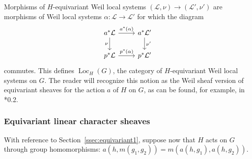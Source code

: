 \documentclass[10pt]{amsart}
\theoremstyle{plain}
\theoremstyle{definition}
\DeclareMathOperator{\Loc}{Loc}
\newcommand{\cs}[1]{{\mathcal{#1}}}
\begin{document}
Morphisms of $H$-equivariant Weil local systems $(\cs{L},\nu)\to (\cs{L}',\nu')$ are morphisms of Weil local systems $\alpha: \cs{L}\to \cs{L}'$ for which the diagram
\begin{equation}\label{E3}
\begin{tikzcd}
\arrow{d}[swap]{\nu} a^*\cs{L} \arrow{r}{a^*(\alpha)} & a^*\cs{L}' \arrow{d}{\nu'} \\
p^*\cs{L} \arrow{r}{p^*(\alpha)} & p^*\cs{L}'
\end{tikzcd}
\end{equation}
commutes.
This defines $\Loc_H(G)$, the category of $H$-equivariant Weil local systems on $G$.
The reader will recognize this notion as the Weil sheaf version of equivariant sheaves for the action $a$ of $H$ on $G$, as can be found, for example, in \cite{bernstein-lunts:equivariant}*{0.2}. 

\subsubsection{Equivariant linear character sheaves}\label{ssec:equivariant2}

With reference to Section~\ref{ssec:equivariant1}, suppose now that $H$ acts on $G$ through group homomorphisms: $a(h, m(g_1,g_2)) = m(a(h, g_1), a(h, g_2))$.
\end{document}
